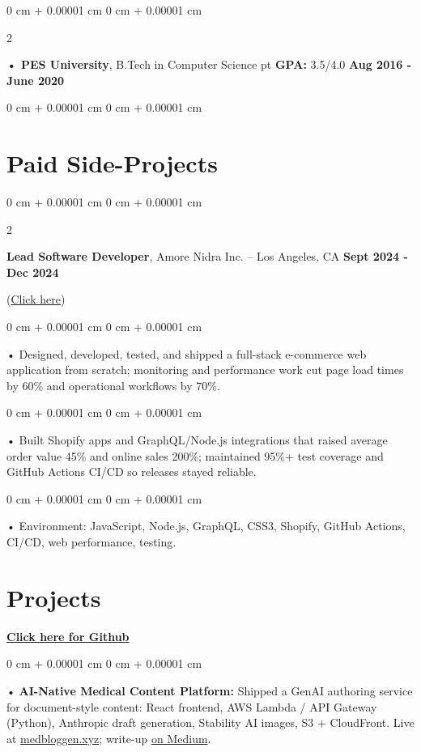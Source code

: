 \documentclass[10pt, letterpaper]{article}
\newenvironment{onecolentry}{
    \begin{adjustwidth}{
        0 cm + 0.00001 cm
    }{
        0 cm + 0.00001 cm
    }
}{
    \end{adjustwidth}
} %
\newenvironment{twocolentry}[2][]{
    \onecolentry
    \def\secondColumn{#2}
    \setcolumnwidth{\fill, 4.5 cm}
    \begin{paracol}{2}
}{
    \switchcolumn \raggedleft \secondColumn
    \end{paracol}
    \endonecolentry
} %
\begin{document}
        \begin{twocolentry}{
            \textbf{Aug 2016 - June 2020}
        }
            \textbf{ • PES University}, B.Tech in Computer Science  pt \textbf{GPA:} 3.5/4.0  \end{twocolentry}
        \begin{onecolentry}

                        \vspace{0.4cm}
    \section{Paid Side-Projects}
            \vspace{2 pt }
        \begin{twocolentry}{
            \textbf{Sept 2024 - Dec 2024}
        }
            \textbf{Lead Software Developer}, Amore Nidra Inc. -- Los Angeles, CA\end{twocolentry}(\href{https://amorenidra.com}{Click here})

        \begin{onecolentry}
             • Designed, developed, tested, and shipped a full-stack e-commerce web application from scratch; monitoring and performance work cut page load times by 60\% and operational workflows by 70\%.
        \end{onecolentry}
        \begin{onecolentry}
             • Built Shopify apps and GraphQL/Node.js integrations that raised average order value 45\% and online sales 200\%; maintained 95\%+ test coverage and GitHub Actions CI/CD so releases stayed reliable.
        \end{onecolentry}
        \begin{onecolentry}
             • Environment: JavaScript, Node.js, GraphQL, CSS3, Shopify, GitHub Actions, CI/CD, web performance, testing.
        \end{onecolentry}
             \vspace{2 pt }

        \vspace{0.4cm}
\section{Projects}
    \vspace{2 pt}
\end{onecolentry}
\textbf{\href{https://github.com/daedalus-s}{Click here for Github}}
\begin{onecolentry}
     • \textbf{AI-Native Medical Content Platform:} Shipped a GenAI authoring service for document-style content: React frontend, AWS Lambda / API Gateway (Python), Anthropic draft generation, Stability AI images, S3 + CloudFront. Live at \href{https://medbloggen.xyz}{medbloggen.xyz}; write-up \href{https://medium.com/@sreenikethaathreya/medical-blog-writing-using-genai-0b7e78b6032f}{on Medium}.
\end{onecolentry}
\end{document}
